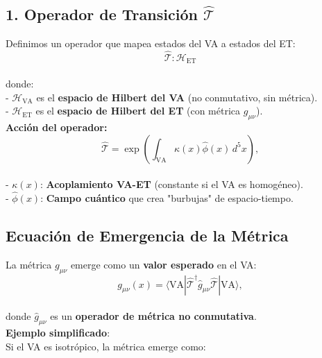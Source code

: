 \documentclass[a4paper]{article}
\theoremstyle{definition}
\theoremstyle{remark}
\numberwithin{equation}{section}
\begin{document}
	\subsection{1. Operador de Transición \(\hat{\mathcal{T}}\)}
	
	Definimos un operador que mapea estados del VA a estados del ET:\\
	
	\[
	\hat{\mathcal{T}} \colon \mathcal{H}_{\text{ET}}
	\]\\
	
	donde:\\
	
	- \(\mathcal{H}_{\text{VA}}\) es el \textbf{espacio de Hilbert del VA} (no conmutativo, sin métrica).\\
	
	- \(\mathcal{H}_{\text{ET}}\) es el \textbf{espacio de Hilbert del ET} (con métrica \(g_{\mu\nu}\)).\\
	
	
	\textbf{Acción del operador:} \\
	
	\[
	\hat{\mathcal{T}} = \exp\left( \int_{\text{VA}} \kappa(x) \hat{\phi}(x) \, d^5x \right),
	\]\\
	
	- \(\kappa(x)\): \textbf{Acoplamiento VA-ET} (constante si el VA es homogéneo).\\
	
	- \(\hat{\phi}(x)\): \textbf{Campo cuántico} que crea "burbujas" de espacio-tiempo.\\
	
	\subsection{Ecuación de Emergencia de la Métrica}
	
	La métrica \(g_{\mu\nu}\) emerge como un \textbf{valor esperado} en el VA:\\
	
	\[
	g_{\mu\nu}(x) = \langle \text{VA} | \hat{\mathcal{T}}^\dagger \hat{g}_{\mu\nu} \hat{\mathcal{T}} | \text{VA} \rangle,
	\]\\
	
	donde \(\hat{g}_{\mu\nu}\) es un \textbf{operador de métrica no conmutativa}.\\
	
	\textbf{Ejemplo simplificado}:\\
	
	Si el VA es isotrópico, la métrica emerge como:\\
	
\end{document}
